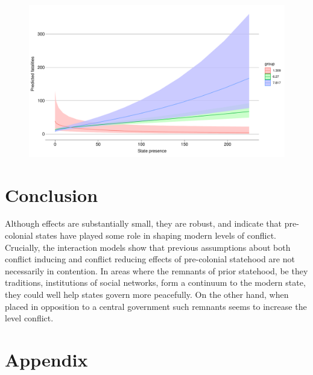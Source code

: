 \documentclass[12pt]{article}
\begin{document}


\begin{figure}[htpb]
	\centering
	\includegraphics[width=\linewidth]{"../R/Output/deathsIntPlot.pdf"}
	\caption{}
	\label{deaths_int}
\end{figure}



\section{Conclusion}

Although effects are substantially small, they are robust, and indicate that
pre-colonial states have played some role in shaping modern levels of conflict.
Crucially, the interaction models show that previous assumptions about both
conflict inducing and conflict reducing effects of pre-colonial statehood are
not necessarily in contention. In areas where the remnants of prior statehood,
be they traditions, institutions of social networks, form a continuum to the
modern state, they could well help states govern more peacefully. On the other
hand, when placed in opposition to a central government such remnants seems to
increase the level conflict.


\pagebreak




\pagebreak
\section*{Appendix}


%

\end{document}
